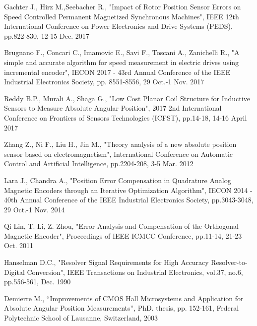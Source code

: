 \documentclass[a4paper]{article}
\begin{document}
\begin{thebibliography}{1}
 Gachter J., Hirz M.,Seebacher R., "Impact of Rotor Position Sensor Errors on Speed
Controlled Permanent Magnetized Synchronous
Machines", IEEE 12th International Conference on Power Electronics and Drive Systems (PEDS), pp.822-830, 12-15 Dec. 2017

 Brugnano F., Concari C., Imamovic E., Savi F., Toscani  A., Zanichelli R., "A simple and accurate algorithm for speed measurement in electric drives using incremental encoder",
IECON 2017 - 43rd Annual Conference of the IEEE Industrial Electronics Society, pp. 8551-8556, 29 Oct.-1 Nov. 2017

 Reddy B.P., Murali A., Shaga G., "Low Cost Planar Coil Structure for Inductive Sensors to Measure Absolute Angular
Position", 2017 2nd International Conference on Frontiers of Sensors Technologies (ICFST), pp.14-18, 14-16 April 2017

 Zhang Z., Ni F., Liu H., Jin M., "Theory analysis of a new absolute position sensor based on electromagnetism", International Conference on Automatic Control and Artificial Intelligence, pp.2204-208, 3-5 Mar. 2012

 Lara J., Chandra A., "Position Error Compensation in Quadrature
Analog Magnetic Encoders through an Iterative
Optimization Algorithm",  IECON 2014 - 40th Annual Conference of the IEEE Industrial Electronics Society, pp.3043-3048, 29 Oct.-1 Nov. 2014 
	
 Qi Lin, T. Li, Z. Zhou, "Error Analysis and Compensation
of the Orthogonal Magnetic Encoder", Proceedings of IEEE ICMCC
Conference, pp.11-14, 21-23 Oct. 2011

 Hanselman D.C., "Resolver Signal Requirements for High Accuracy
Resolver-to-Digital Conversion", IEEE Transactions on Industrial
Electronics, vol.37, no.6, pp.556-561, Dec. 1990 

 Demierre M., “Improvements of CMOS Hall Microsystems and
Application for Absolute Angular Position Measurements”, PhD. thesis,
pp. 152-161, Federal Polytechnic School of Lausanne, Switzerland, 2003
\end{thebibliography}
\end{document}
